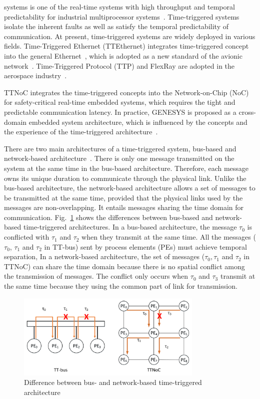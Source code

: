 \documentclass[10pt,journal]{IEEEtran}
\theoremstyle{remark}
\begin{document}
 systems is one of the real-time systems with high throughput and temporal predictability for industrial multiprocessor systems~\cite{DBLP:journals/rts/CraciunasO16}.
Time-triggered systems isolate the inherent faults as well as satisfy the temporal predictability of communication.
At present, time-triggered systems are widely deployed in various fields.
Time-Triggered Ethernet (TTEthernet) integrates time-triggered concept into the general Ethernet~\cite{DBLP:conf/nca/SteinerBHPV09}, which is adopted as a new standard of the avionic network~\cite{DBLP:conf/dsrt/BejiHGM14}. 
Time-Triggered Protocol (TTP) and FlexRay are adopted in the aerospace industry~\cite{DBLP:journals/taes/HuLWV15}.

TTNoC integrates the time-triggered concepts into the Network-on-Chip (NoC) for safety-critical real-time embedded systems, which requires the tight and predictable communication latency.
In practice,
 GENESYS is proposed as a cross-domain embedded system architecture,
  which is influenced by the concepts and the experience of the time-triggered architecture~\cite{DBLP:conf/ladc/Kopetz11}.

There are two main architectures of a time-triggered system,
 bus-based and network-based architecture~\cite{DBLP:conf/date/HuangBRBK12}.
There is only one message transmitted on the system at the same time in the bus-based architecture. 
Therefore,
 each message owns its unique duration to communicate through the physical link.
Unlike the bus-based architecture,
 the network-based architecture allows a set of messages to be transmitted at the same time,
 provided that the physical links used by the messages are non-overlapping.
It entails messages sharing the time domain for communication.
Fig.~\ref{f:diff} shows the differences between bus-based and network-based time-triggered architectures.
In a bus-based architecture, the message $\tau_0$ is conflicted with $\tau_1$ and $\tau_2$ when they transmit at the same time.
All the messages ($\tau_0$, $\tau_1$ and $\tau_2$ in TT-bus) sent by process elements (PEs) must achieve temporal separation,
In a network-based architecture,
 the set of messages ($\tau_0,\tau_1$ and $\tau_2$ in TTNoC) can share the time domain because there is no spatial conflict among the transmission of messages.
The conflict only occurs when $\tau_0$ and $\tau_3$ transmit at the same time because they using the common part of link for transmission.
\begin{figure}[!t]
	\centering
	\includegraphics[width=3.5in]{picture/difference.pdf}
	\caption{Difference between bus- and network-based time-triggered architecture}
	\label{f:diff}
\end{figure}
\end{document}
